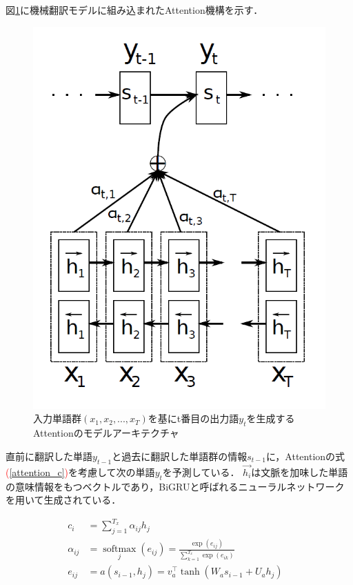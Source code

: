 \documentclass[12pt,a4j]{jreport}
\begin{document}
図\ref{fig_attention}に機械翻訳モデルに組み込まれたAttention機構を示す．

\begin{figure}[H]
	\centering
	\includegraphics[keepaspectratio, width=120mm]{img/attention.png}
	\caption{入力単語群$(x_1, x_2, ... , x_T)$を基にt番目の出力語$y_t$を生成するAttentionのモデルアーキテクチャ\protect\footnotemark[1]}
	\label{fig_attention}
\end{figure}

直前に翻訳した単語$y_{t-1}$と過去に翻訳した単語群の情報$s_{t-1}$に，Attentionの式\textcolor{red}{(\ref{attention_c})}を考慮して次の単語$y_t$を予測している．
$\vec{h_i}$は文脈を加味した単語の意味情報をもつベクトルであり，BiGRUと呼ばれるニューラルネットワークを用いて生成されている．

\begin{align}
  c_{i} &= \sum_{j=1}^{T_{x}} \alpha_{i j} h_{j} &
  \label{attention_c}
  \\
  \alpha_{i j} &= \operatorname*{softmax}_j(e_{ij}) = \frac{\exp \left(e_{i j}\right)}{\sum_{k=1}^{T_{x}} \exp \left(e_{i k}\right)}
  \label{attention_alpha}
  \\
  e_{i j} &= a\left(s_{i-1}, h_{j}\right) = v_{a}^{\top} \tanh \left(W_{a} s_{i-1}+U_{a} h_{j}\right)
  \label{attention_e}
\end{align}
\end{document}
